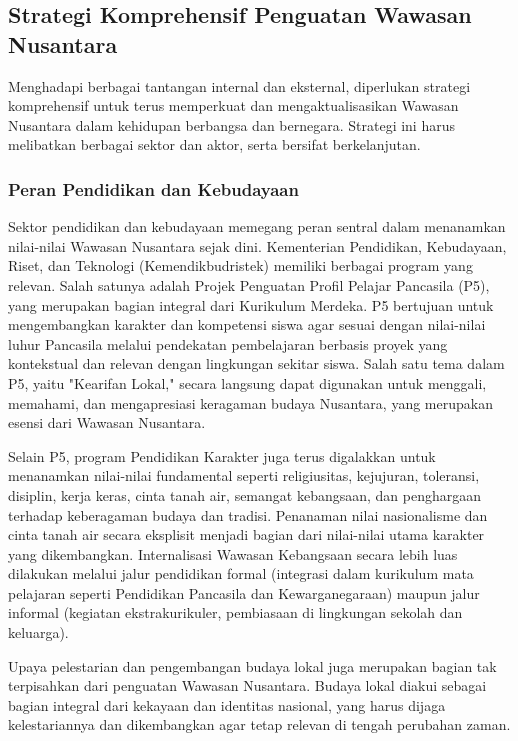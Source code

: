 \documentclass[12pt, a4paper]{article}
\begin{document}
\subsection*{Strategi Komprehensif Penguatan Wawasan Nusantara}

Menghadapi berbagai tantangan internal dan eksternal, diperlukan strategi komprehensif untuk terus memperkuat dan mengaktualisasikan Wawasan Nusantara dalam kehidupan berbangsa dan bernegara. Strategi ini harus melibatkan berbagai sektor dan aktor, serta bersifat berkelanjutan.
\subsubsection*{Peran Pendidikan dan Kebudayaan}

Sektor pendidikan dan kebudayaan memegang peran sentral dalam menanamkan nilai-nilai Wawasan Nusantara sejak dini. Kementerian Pendidikan, Kebudayaan, Riset, dan Teknologi (Kemendikbudristek) memiliki berbagai program yang relevan. Salah satunya adalah Projek Penguatan Profil Pelajar Pancasila (P5), yang merupakan bagian integral dari Kurikulum Merdeka. P5 bertujuan untuk mengembangkan karakter dan kompetensi siswa agar sesuai dengan nilai-nilai luhur Pancasila melalui pendekatan pembelajaran berbasis proyek yang kontekstual dan relevan dengan lingkungan sekitar siswa. Salah satu tema dalam P5, yaitu "Kearifan Lokal," secara langsung dapat digunakan untuk menggali, memahami, dan mengapresiasi keragaman budaya Nusantara, yang merupakan esensi dari Wawasan Nusantara.  

Selain P5, program Pendidikan Karakter juga terus digalakkan untuk menanamkan nilai-nilai fundamental seperti religiusitas, kejujuran, toleransi, disiplin, kerja keras, cinta tanah air, semangat kebangsaan, dan penghargaan terhadap keberagaman budaya dan tradisi. Penanaman nilai nasionalisme dan cinta tanah air secara eksplisit menjadi bagian dari nilai-nilai utama karakter yang dikembangkan. Internalisasi Wawasan Kebangsaan secara lebih luas dilakukan melalui jalur pendidikan formal (integrasi dalam kurikulum mata pelajaran seperti Pendidikan Pancasila dan Kewarganegaraan) maupun jalur informal (kegiatan ekstrakurikuler, pembiasaan di lingkungan sekolah dan keluarga).  

Upaya pelestarian dan pengembangan budaya lokal juga merupakan bagian tak terpisahkan dari penguatan Wawasan Nusantara. Budaya lokal diakui sebagai bagian integral dari kekayaan dan identitas nasional, yang harus dijaga kelestariannya dan dikembangkan agar tetap relevan di tengah perubahan zaman.  
\end{document}
